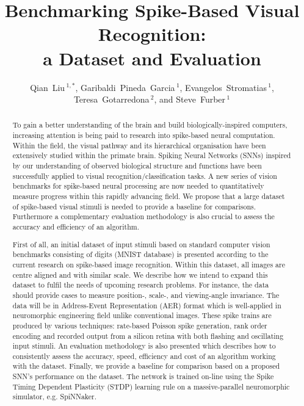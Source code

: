 \documentclass[pdftex]{bioinfo}
\def\firstAuthorLast{Qian Liu {et~al.}} %
\def\Authors{Qian~Liu\,$^{1,*}$, Garibaldi~Pineda~Garcia\,$^{1}$, Evangelos~Stromatias\,$^{1}$, Teresa~Gotarredona\,$^{2}$, and Steve~Furber\,$^{1}$}
\def\Address{$^{1}$SpiNNaker, Advanced Processor Technologies Research Group, School of Computer Science, University of Manchester, Manchester, United Kingdom\\
$^{2}$Instituto de Microelectrónica de Sevilla (IMSE-
CNM-CSIC), Sevilla, Spain }
\begin{document}

\title[Benchmarking Spike-Based Visual Recognition: a Dataset and Evaluation]{Benchmarking  Spike-Based Visual Recognition:\\ a Dataset and Evaluation}
\author[\firstAuthorLast ]{\Authors}
\address{\Address}
\history{}

\editor{}


\maketitle
\begin{abstract}
To gain a better understanding of the brain and build biologically-inspired computers, increasing attention is being paid to research into spike-based neural computation.
Within the field, the visual pathway and its hierarchical organisation have been extensively studied within the primate brain.
Spiking Neural Networks (SNNs) inspired by our understanding of observed biological structure and functions have been successfully applied to visual recognition/classification tasks.
A new series of vision benchmarks for spike-based neural processing are now needed to quantitatively measure progress within this rapidly advancing field.
We propose that a large dataset of spike-based visual stimuli is needed to provide a baseline for comparisons.
Furthermore a complementary evaluation methodology is also crucial to assess the accuracy and efficiency of an algorithm.

First of all, an initial dataset of input stimuli based on standard computer vision benchmarks consisting of %
digits (MNIST database) is presented according to the current research on spike-based image recognition.
Within this dataset, all images are centre aligned and with similar scale.
We describe how we intend to expand this dataset to fulfil the needs of upcoming research problems.
For instance, the data should provide cases to measure position-, scale-, and viewing-angle invariance.
The data will be in Address-Event Representation (AER) format which is well-applied in neuromorphic engineering field unlike conventional images.
These spike trains are produced by various techniques: rate-based Poisson spike generation, rank order encoding and recorded output from a silicon retina with both flashing and oscillating input stimuli.
An evaluation methodology is also presented which describes how to consistently assess the accuracy, speed, efficiency and cost of an algorithm working with the dataset.
Finally, we provide a baseline for comparison based on a proposed SNN's performance on the dataset.
The network is trained on-line using the Spike Timing Dependent Plasticity (STDP) learning rule on a massive-parallel neuromorphic simulator, e.g. SpiNNaker.


\end{abstract}
\end{document}

